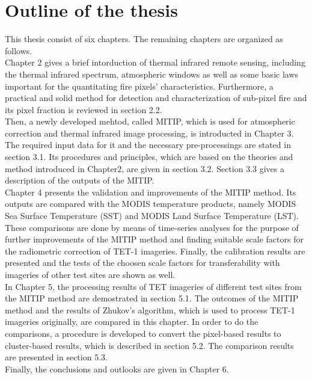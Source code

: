 \section{Outline of the thesis}
This thesis consist of six chapters. The remaining chapters are organized as follows.\\

\noindent Chapter 2 gives a brief intorduction of thermal infrared remote sensing, including the thermal infrared spectrum, atmospheric windows as well as some basic laws important for the quantitating fire pixels' characteristics. Furthermore, a practical and solid method for detection and characterization of sub-pixel fire and its pixel fraction is reviewed in section 2.2.\\

\noindent Then, a newly developed mehtod, called MITIP, which is used for atmospheric correction and thermal infrared image processing, is introducted in Chapter 3. The required input data for it and the necessary pre-processings are stated in section 3.1. Its procedures and principles, which are based on the theories and method introduced in Chapter2, are given in section 3.2. Section 3.3 gives a description of the outputs of the MITIP.\\

\noindent Chapter 4 presents the validation and improvements of the MITIP method. Its outputs are compared with the MODIS temperature products, namely MODIS Sea Surface Temperature (SST) and MODIS Land Surface Temperature (LST). These comparisons are done by means of time-series analyses for the purpose of further improvements of the MITIP method and finding suitable scale factors for the radiometric correction of TET-1 imageries. Finally, the calibration results are presented and the tests of the choosen scale factors for transferability with imageries of other test sites are shown as well.\\

\noindent In Chapter 5, the processing results of TET imageries of different test sites from the MITIP method are demostrated in section 5.1. The outcomes of the MITIP method and the results of Zhukov's algorithm, which is used to process TET-1 imageries originally, are compared in this chapter. In order to do the comparisons, a procedure is developed to convert the pixel-based results to cluster-based results, which is described in section 5.2. The comparison results are presented in section 5.3.\\

\noindent Finally, the conclusions and outlooks are given in Chapter 6.\\
